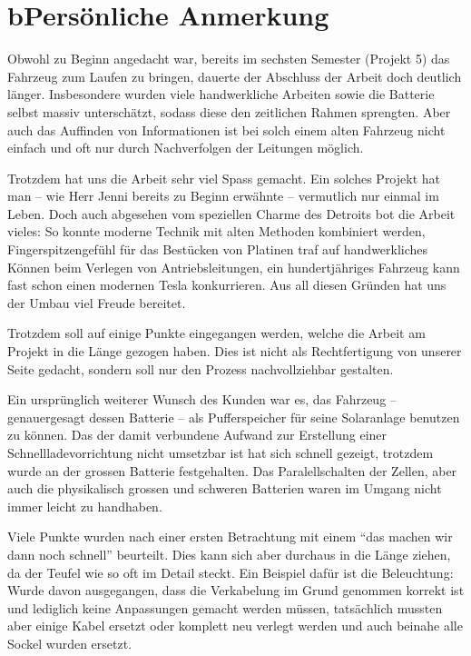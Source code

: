 \chapter*{b\quad Persönliche Anmerkung}
Obwohl zu Beginn angedacht war, bereits im sechsten Semester (Projekt 5) das Fahrzeug zum Laufen zu bringen, dauerte der Abschluss der Arbeit doch deutlich länger. Insbesondere wurden viele handwerkliche Arbeiten sowie die Batterie selbst massiv unterschätzt, sodass diese den zeitlichen Rahmen sprengten. Aber auch das Auffinden von Informationen ist bei solch einem alten Fahrzeug nicht einfach und oft nur durch Nachverfolgen der Leitungen möglich.

Trotzdem hat uns die Arbeit sehr viel Spass gemacht. Ein solches Projekt hat man -- wie Herr Jenni bereits zu Beginn erwähnte -- vermutlich nur einmal im Leben. Doch auch abgesehen vom speziellen Charme des Detroits bot die Arbeit vieles: So konnte moderne Technik mit alten Methoden kombiniert werden, Fingerspitzengefühl für das Bestücken von Platinen traf auf handwerkliches Können beim Verlegen von Antriebsleitungen, ein hundertjähriges Fahrzeug kann fast schon einen modernen Tesla konkurrieren. Aus all diesen Gründen hat uns der Umbau viel Freude bereitet.

Trotzdem soll auf einige Punkte eingegangen werden, welche die Arbeit am Projekt in die Länge gezogen haben. Dies ist nicht als Rechtfertigung von unserer Seite gedacht, sondern soll nur den Prozess nachvollziehbar gestalten.

Ein ursprünglich weiterer Wunsch des Kunden war es, das Fahrzeug -- genauergesagt dessen Batterie -- als Pufferspeicher für seine Solaranlage benutzen zu können. Das der damit verbundene Aufwand zur Erstellung einer Schnellladevorrichtung nicht umsetzbar ist hat sich schnell gezeigt, trotzdem wurde an der grossen Batterie festgehalten. Das Paralellschalten der Zellen, aber auch die physikalisch grossen und schweren Batterien waren im Umgang nicht immer leicht zu handhaben.

Viele Punkte wurden nach einer ersten Betrachtung mit einem "`das machen wir dann noch schnell"' beurteilt. Dies kann sich aber durchaus in die Länge ziehen, da der Teufel wie so oft im Detail steckt. Ein Beispiel dafür ist die Beleuchtung: Wurde davon ausgegangen, dass die Verkabelung im Grund genommen korrekt ist und lediglich keine Anpassungen gemacht werden müssen, tatsächlich mussten aber einige Kabel ersetzt oder komplett neu verlegt werden und auch beinahe alle Sockel wurden ersetzt.

